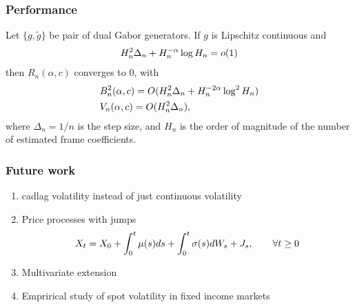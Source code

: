 \documentclass[fleqn]{beamer}
\begin{document}
\begin{frame}[allowframebreaks]
  \frametitle{Performance}
  \tiny
  
  \normalsize
  
  \framebreak
\begin{theorem} \label{pr:consistency}
  Let $\{g, \tilde{g}\}$ be pair of dual Gabor generators. If $g$ is Lipschitz continuous and  
  \begin{align}
    H_n^2 \Delta_n  + H_n^{-\alpha} \log H_n= o(1) \notag
    \label{}
  \end{align}
   then $R_n(\alpha,c)$ converges to 0, with 
  \begin{align}
    & B_n^2(\alpha,c)  = O(H_n^2\Delta_n  + H_n^{-2\alpha} \log^2 H_n)\notag \\
    & V_n(\alpha,c)  = O(H_n^2 \Delta_n), \notag
    \label{}
  \end{align}
  where  $\Delta_n = 1/n$ is the step size, and $H_n$ is the order of magnitude of the number of estimated frame coefficients. 
\end{theorem}
\end{frame}
\begin{frame}
  \frametitle{Future work}
  \begin{enumerate}
    \item cadlag volatility instead of just continuous volatility
    \item Price processes with jumps
    \begin{align}
      X_t = X_0 + \int_0^t \mu(s) d s + \int_0^t \sigma(s) d W_s + J_s, \qquad \forall t \ge 0\notag
      \label{}
    \end{align}
  \item Multivariate extension
  \item Emprirical study of spot volatility in fixed income markets
  \end{enumerate}
\end{frame}
\end{document}
